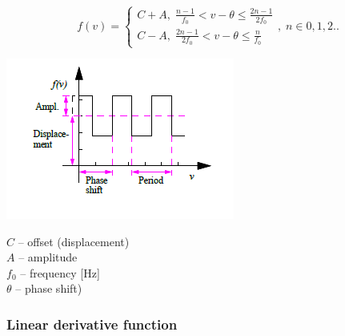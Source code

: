 $$
  f(v)=\left\{\begin{array}{ll}
  C+A,\; \frac{n-1}{f_0}   < v-\theta \leq \frac{2n-1}{2f_0} \\
  C-A,\; \frac{2n-1}{2f_0} < v-\theta \leq \frac{n}{f_0}
  \end{array}\right.,\; n \in 0,1,2..
$$
\noindent
\begin{minipage}{0.45\textwidth}
  \includegraphics[width=\textwidth]{Figures/4-Functions-PeriodicSquarePulse}
\end{minipage}%
\hfill\begin{minipage}{0.5\textwidth}
  $C$ -- offset (displacement) \\
  $A$ -- amplitude \\
  $f_0$ -- frequency [Hz] \\
  $\theta$ -- phase shift)
\end{minipage}

\subsubsection{Linear derivative function}

